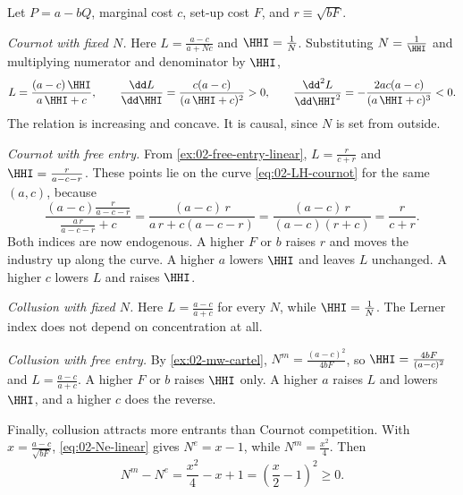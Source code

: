 \begin{example}\label{ex:02-LH}
Let $P = a - bQ$, marginal cost $c$, set-up cost $F$, and $r \equiv \sqrt{bF}$.

\emph{Cournot with fixed $N$.} Here $L = \frac{a - c}{a + Nc}$ and $\HHI = \frac{1}{N}$. Substituting
$N = \frac{1}{\HHI}$ and multiplying numerator and denominator by $\HHI$,
\begin{equation}\label{eq:02-LH-cournot}
L = \frac{(a - c)\,\HHI}{a\,\HHI + c}, \qquad
\frac{\dd L}{\dd \HHI} = \frac{c(a - c)}{(a\,\HHI + c)^2} > 0, \qquad
\frac{\dd^2 L}{\dd \HHI^2} = -\frac{2ac(a - c)}{(a\,\HHI + c)^3} < 0 .
\end{equation}
The relation is increasing and concave. It is causal, since $N$ is set from outside.

\emph{Cournot with free entry.} From \cref{ex:02-free-entry-linear}, $L = \frac{r}{c + r}$ and
$\HHI = \frac{r}{a - c - r}$. These points lie on the curve \eqref{eq:02-LH-cournot} for the same $(a, c)$, because
\begin{equation*}
\frac{(a - c)\frac{r}{a - c - r}}{\frac{a\, r}{a - c - r} + c} = \frac{(a - c)\, r}{a\, r + c(a - c - r)}
= \frac{(a - c)\, r}{(a - c)(r + c)} = \frac{r}{c + r} .
\end{equation*}
Both indices are now endogenous. A higher $F$ or $b$ raises $r$ and moves the industry up along the curve. A higher
$a$ lowers $\HHI$ and leaves $L$ unchanged. A higher $c$ lowers $L$ and raises $\HHI$.

\emph{Collusion with fixed $N$.} Here $L = \frac{a - c}{a + c}$ for every $N$, while $\HHI = \frac{1}{N}$. The
Lerner index does not depend on concentration at all.

\emph{Collusion with free entry.} By \cref{ex:02-mw-cartel}, $N^m = \frac{(a - c)^2}{4bF}$, so
$\HHI = \frac{4bF}{(a - c)^2}$ and $L = \frac{a - c}{a + c}$. A higher $F$ or $b$ raises $\HHI$ only. A higher $a$
raises $L$ and lowers $\HHI$, and a higher $c$ does the reverse.

Finally, collusion attracts more entrants than Cournot competition. With $x = \frac{a - c}{\sqrt{bF}}$,
\eqref{eq:02-Ne-linear} gives $N^e = x - 1$, while $N^m = \frac{x^2}{4}$. Then
\begin{equation*}
N^m - N^e = \frac{x^2}{4} - x + 1 = \left(\frac{x}{2} - 1\right)^2 \ge 0 .
\end{equation*}
\end{example}

